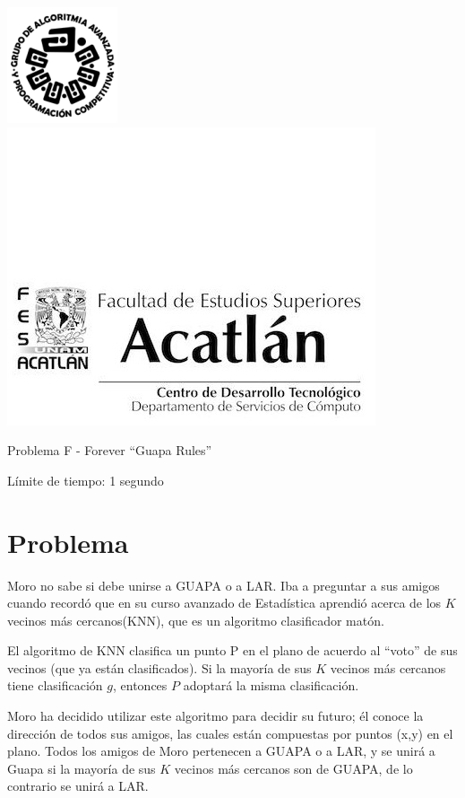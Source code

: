 \includegraphics[scale=0.6]{logo} \hspace*{9.00cm}
\includegraphics[scale=0.5]{dsc} 
\begin{center}
	\Large Problema F - Forever ``Guapa Rules''
\end{center}

\begin{flushright}
Límite de tiempo: 1 segundo
\par\end{flushright}


\section*{Problema}

Moro no sabe si debe unirse a GUAPA o a LAR. Iba a preguntar a sus amigos cuando recordó que en su curso avanzado de Estadística aprendió acerca de los $K$ vecinos más cercanos(KNN), que es un algoritmo clasificador matón.

El algoritmo de KNN clasifica un punto P en el plano de acuerdo al ``voto'' de sus vecinos (que ya están clasificados). Si la mayoría de sus $K$ vecinos más cercanos tiene clasificación $g$, entonces $P$ adoptará la misma clasificación.

Moro ha decidido utilizar este algoritmo para decidir su futuro; él conoce la dirección de todos sus amigos, las cuales están compuestas por  puntos (x,y) en el plano. Todos los amigos de Moro pertenecen a GUAPA o a LAR, y se unirá a Guapa si la mayoría de sus $K$ vecinos más cercanos son de GUAPA, de lo contrario se unirá a LAR.

